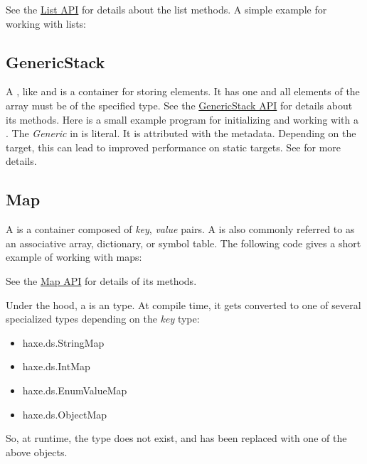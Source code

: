 \documentclass{haxe}
\begin{document}
See the \href{http://api.haxe.org/List.html}{List API} for details about the list methods.  A simple example for working with lists:

\subsection{GenericStack}
\label{std-GenericStack}
A , like  and  is a container for storing elements.  It has one  and all elements of the array must be of the specified type. See the \href{http://api.haxe.org/haxe/ds/GenericStack.html}{GenericStack API} for details about its methods.  Here is a small example program for initializing and working with a .
The \emph{Generic} in  is literal.  It is attributed with the  metadata.  Depending on the target, this can lead to improved performance on static targets.  See  for more details.
\subsection{Map}
\label{std-Map}

A  is a container composed of \emph{key}, \emph{value} pairs.  A  is also commonly referred to as an associative array, dictionary, or symbol table.  The following code gives a short example of working with maps:


See the \href{http://api.haxe.org/haxe/Map.html}{Map API} for details of its methods.

Under the hood, a  is an  type.  At compile time, it gets converted to one of several specialized types depending on the \emph{key} type:
\begin{itemize}
	\item haxe.ds.StringMap
	\item haxe.ds.IntMap
	\item haxe.ds.EnumValueMap
	\item haxe.ds.ObjectMap
\end{itemize}
So, at runtime, the  type does not exist, and has been replaced with one of the above objects.  
\end{document}
